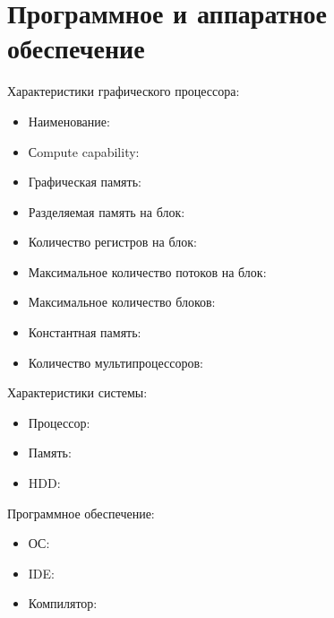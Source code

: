 \section{Программное и аппаратное обеспечение}
Характеристики графического процессора:
\begin{itemize}[noitemsep, topsep=0pt]
	\item Наименование: 
	\item Сompute capability: 
	\item Графическая память: 
	\item Разделяемая память на блок: 
	\item Количество регистров на блок: 
	\item Максимальное количество потоков на блок: 
	\item Максимальное количество блоков: 
	\item Константная память: 
	\item Количество мультипроцессоров: 
\end{itemize}

Характеристики системы:
\begin{itemize}[noitemsep, topsep=0pt]
	\item Процессор: 
	\item Память: 
	\item HDD:
\end{itemize}

Программное обеспечение:
\begin{itemize}[noitemsep, topsep=0pt]
	\item ОС: 
	\item IDE: 
	\item Компилятор: 
\end{itemize}